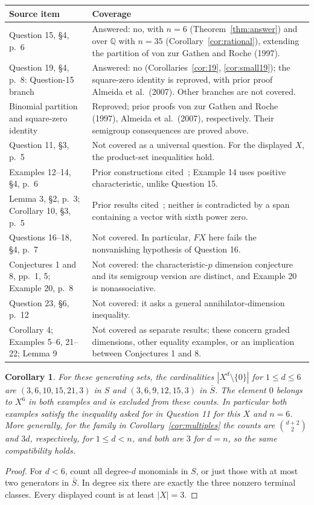 \documentclass[11pt]{article}
\newtheorem{corollary}[theorem]{Corollary}
\begin{document}
\smallskip
\noindent\begin{tabularx}{\linewidth}{@{}p{.25\linewidth}X@{}}
\toprule
Source item & Coverage \\
\midrule
Question 15, \S4, p.\ 6 & Answered: no, with $n=6$ (Theorem~\ref{thm:answer}) and over $\mathbb Q$ with $n=35$ (Corollary~\ref{cor:rational}), extending the partition of von zur Gathen and Roche (1997). \\
Question 19, \S4, p.\ 8: Question-15 branch & Answered: no (Corollaries~\ref{cor:19}, \ref{cor:small19}); the square-zero identity is reproved, with prior proof Almeida et al.\ (2007). Other branches are not covered. \\
Binomial partition and square-zero identity & Reproved; prior proofs von zur Gathen and Roche (1997), Almeida et al.\ (2007), respectively. Their semigroup consequences are proved above. \\
Question 11, \S3, p.\ 5 & Not covered as a universal question. For the displayed $X$, the product-set inequalities hold. \\
Examples 12--14, \S4, p.\ 6 & Prior constructions cited~\cite{Bergman}; Example 14 uses positive characteristic, unlike Question 15. \\
Lemma 3, \S2, p.\ 3; Corollary 10, \S3, p.\ 5 & Prior results cited~\cite{Bergman}; neither is contradicted by a span containing a vector with sixth power zero. \\
Questions 16--18, \S4, p.\ 7 & Not covered. In particular, $F X$ here fails the nonvanishing hypothesis of Question 16. \\
Conjectures 1 and 8, pp.\ 1, 5; Example 20, p.\ 8 & Not covered: the characteristic-$p$ dimension conjecture and its semigroup version are distinct, and Example 20 is nonassociative. \\
Question 23, \S6, p.\ 12 & Not covered: it asks a general annihilator-dimension inequality. \\
Corollary 4; Examples 5--6, 21--22; Lemma 9 & Not covered as separate results; these concern graded dimensions, other equality examples, or an implication between Conjectures 1 and 8. \\
\bottomrule
\end{tabularx}

\begin{corollary}\label{cor:11}
For these generating sets, the cardinalities $|X^d\setminus\{0\}|$ for $1\le d\le6$
are $(3,6,10,15,21,3)$ in $S$ and $(3,6,9,12,15,3)$ in $\bar S$.
The element $0$ belongs to $X^6$ in both examples and is excluded from these counts.
In particular both examples satisfy the inequality asked for in
Question 11 for this $X$ and $n=6$.
More generally, for the family in Corollary~\ref{cor:multiples} the counts
are $\binom{d+2}{2}$ and $3d$, respectively, for $1\le d<n$,
and both are $3$ for $d=n$, so the same compatibility holds.
\end{corollary}
\begin{proof}
For $d<6$, count all degree-$d$ monomials in $S$, or just those with at
most two generators in $\bar S$. In degree six there are exactly the
three nonzero terminal classes. Every displayed count is at least $|X|=3$.
\end{proof}
\end{document}
